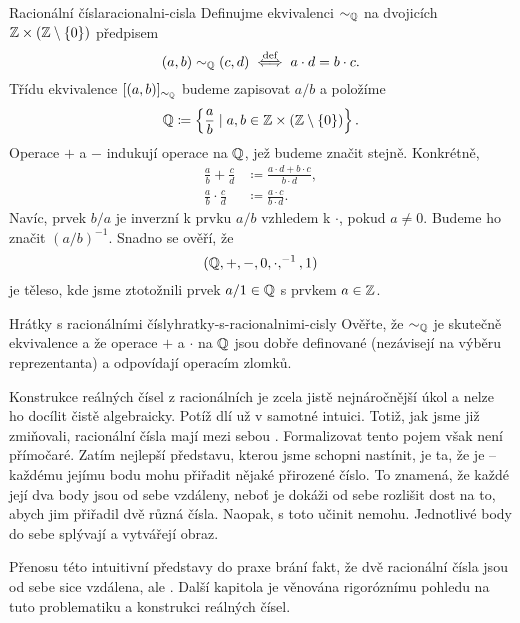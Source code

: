 \begin{definition}{Racionální čísla}{racionalni-cisla}
 Definujme ekvivalenci $ \sim _{\mathbb{Q}}$ na dvojicích $\mathbb{Z} \times (\mathbb{Z} \setminus
 \{0\})$ předpisem
 \[
  (a,b) \sim _{\mathbb{Q}}(c,d) \overset{\text{def}}{\iff} a \cdot d = b
  \cdot c.
 \]
 Třídu ekvivalence $[(a,b)]_{ \sim _{\mathbb{Q}}}$ budeme zapisovat $a / b$ a položíme
 \[
  \mathbb{Q} \coloneqq \left\{ \frac{a}{b} \mid a,b \in \mathbb{Z} \times (\mathbb{Z} \setminus \{0\})
  \right\}.
 \]
 Operace $+$ a $-$ indukují operace na $\mathbb{Q}$, jež budeme značit stejně.
 Konkrétně,
 \begin{align*}
  \frac{a}{b} + \frac{c}{d} &\coloneqq \frac{a \cdot d+b \cdot c}{b \cdot d},\\
  \frac{a}{b} \cdot \frac{c}{d} & \coloneqq \frac{a \cdot c}{b \cdot d}.
 \end{align*}
 Navíc, prvek $b / a$ je inverzní k prvku $a / b$ vzhledem k $ \cdot $, pokud
 $a \neq 0$. Budeme ho značit $(a / b)^{-1}$. Snadno se ověří, že
 \[
  (\mathbb{Q},+,-,0, \cdot,^{-1},1)
 \]
 je těleso, kde jsme ztotožnili prvek $a / 1 \in \mathbb{Q}$ s prvkem $a \in \mathbb{Z}$.
\end{definition}

\begin{exercise}{Hrátky s racionálními čísly}{hratky-s-racionalnimi-cisly}
 Ověřte, že $ \sim _{\mathbb{Q}}$ je skutečně ekvivalence a že operace $+$ a $ \cdot $
 na $\mathbb{Q}$ jsou dobře definované (nezávisejí na výběru reprezentanta) a odpovídají
  operacím zlomků.
\end{exercise}

Konstrukce reálných čísel z racionálních je zcela jistě nejnáročnější úkol a
nelze ho docílit čistě algebraicky. Potíž dlí už v samotné intuici. Totiž, jak
jsme již zmiňovali, racionální čísla mají mezi sebou . Formalizovat
tento pojem však není přímočaré. Zatím nejlepší představu, kterou jsme schopni
nastínit, je ta, že  je  -- každému jejímu
bodu mohu přiřadit nějaké přirozené číslo. To znamená, že každé její dva body
jsou od sebe vzdáleny, neboť je dokáži od sebe rozlišit dost na to, abych jim
přiřadil dvě různá čísla. Naopak, s  toto učinit nemohu.
Jednotlivé body do sebe splývají a vytvářejí  obraz.

Přenosu této intuitivní představy do praxe brání fakt, že dvě racionální čísla
jsou od sebe sice vzdálena, ale . Další kapitola je věnována
rigoróznímu pohledu na tuto problematiku a konstrukci reálných čísel.
